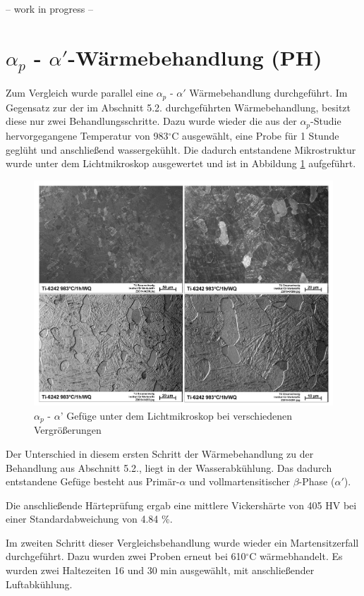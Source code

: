 -- work in progress --

\section{$\alpha_p$ - $\alpha'$-Wärmebehandlung (PH)}

Zum Vergleich wurde parallel eine $\alpha_p$ - $\alpha'$ Wärmebehandlung durchgeführt. Im Gegensatz zur der im Abschnitt 5.2. durchgeführten Wärmebehandlung, besitzt diese nur zwei Behandlungsschritte.
Dazu wurde wieder die aus der $\alpha_p$-Studie hervorgegangene Temperatur von 983$^\circ$C ausgewählt, eine Probe für 1 Stunde geglüht und anschließend wassergekühlt. Die dadurch entstandene Mikrostruktur wurde unter dem Lichtmikroskop ausgewertet und ist in Abbildung \ref{fig:abbildung-19} aufgeführt.

\begin{figure}[h]
	\centering
	\includegraphics[width=0.9\linewidth]{./Bilder/Abbildung 19}
	\caption[Abbildung 19]{$\alpha_p$ - $\alpha$' Gefüge unter dem Lichtmikroskop bei verschiedenen Vergrößerungen}
	\label{fig:abbildung-19}
\end{figure}

Der Unterschied in diesem ersten Schritt der Wärmebehandlung zu der Behandlung aus Abschnitt 5.2., liegt in der Wasserabkühlung. Das dadurch entstandene Gefüge besteht aus Primär-$\alpha$ und vollmartensitischer $\beta$-Phase ($\alpha'$).

Die anschließende Härteprüfung ergab eine mittlere Vickershärte von 405 HV bei einer Standardabweichung von 4.84 \%.

\pagebreak

Im zweiten Schritt dieser Vergleichsbehandlung wurde wieder ein Martensitzerfall durchgeführt. Dazu wurden zwei Proben erneut bei 610$^\circ$C wärmebhandelt. Es wurden zwei Haltezeiten 16 und 30 min ausgewählt, mit anschließender Luftabkühlung. 

